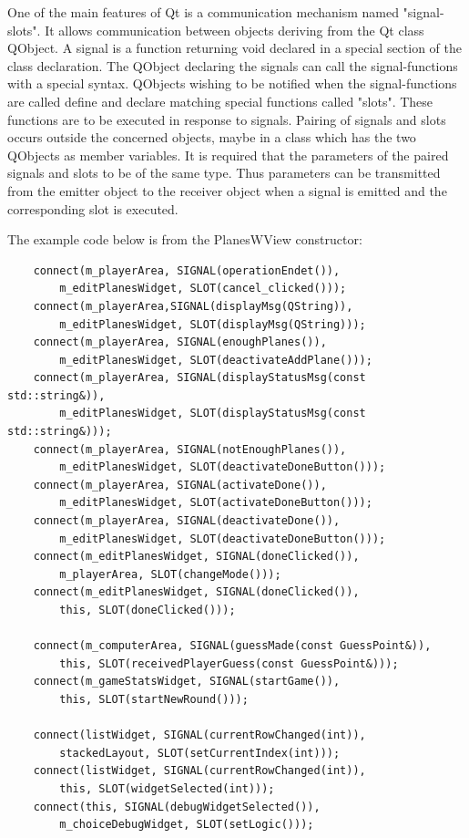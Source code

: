 One of the main features of Qt is a communication mechanism named "signal-slots". It allows communication between objects deriving from the Qt class QObject. A signal is a function returning void declared in a special section of the class declaration. The QObject declaring the signals can call the signal-functions with a special syntax. QObjects wishing to be notified when the signal-functions are called define and declare matching special functions called "slots". These functions are to be executed in response to signals. Pairing of signals and slots occurs outside the concerned objects, maybe in a class which has the two QObjects as member variables. It is required that the parameters of the paired signals and slots to be of the same type. Thus parameters can be transmitted from the emitter object to the receiver object when a signal is emitted and the corresponding slot is executed. 

The example code below is from the PlanesWView constructor:

\begin{lstlisting}
    connect(m_playerArea, SIGNAL(operationEndet()),
		m_editPlanesWidget, SLOT(cancel_clicked()));
	connect(m_playerArea,SIGNAL(displayMsg(QString)),
		m_editPlanesWidget, SLOT(displayMsg(QString)));
	connect(m_playerArea, SIGNAL(enoughPlanes()),
		m_editPlanesWidget, SLOT(deactivateAddPlane()));
	connect(m_playerArea, SIGNAL(displayStatusMsg(const std::string&)),
		m_editPlanesWidget, SLOT(displayStatusMsg(const std::string&)));
	connect(m_playerArea, SIGNAL(notEnoughPlanes()),
		m_editPlanesWidget, SLOT(deactivateDoneButton()));
	connect(m_playerArea, SIGNAL(activateDone()),
		m_editPlanesWidget, SLOT(activateDoneButton()));
	connect(m_playerArea, SIGNAL(deactivateDone()),
		m_editPlanesWidget, SLOT(deactivateDoneButton()));
	connect(m_editPlanesWidget, SIGNAL(doneClicked()),
		m_playerArea, SLOT(changeMode()));
	connect(m_editPlanesWidget, SIGNAL(doneClicked()),
		this, SLOT(doneClicked()));

	connect(m_computerArea, SIGNAL(guessMade(const GuessPoint&)),
		this, SLOT(receivedPlayerGuess(const GuessPoint&)));
	connect(m_gameStatsWidget, SIGNAL(startGame()),
		this, SLOT(startNewRound()));
	
	connect(listWidget, SIGNAL(currentRowChanged(int)),
		stackedLayout, SLOT(setCurrentIndex(int)));
	connect(listWidget, SIGNAL(currentRowChanged(int)),
		this, SLOT(widgetSelected(int)));
	connect(this, SIGNAL(debugWidgetSelected()),
		m_choiceDebugWidget, SLOT(setLogic()));
\end{lstlisting}

